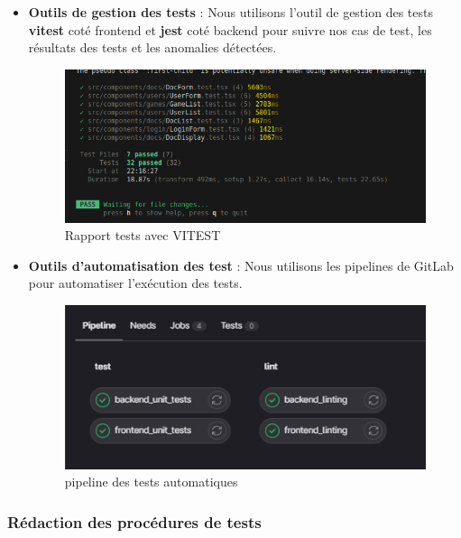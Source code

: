 \begin{itemize}\addtolength{\itemsep}{-0.35\baselineskip}%
	\item \textbf{Outils de gestion des tests }: Nous utilisons l'outil de gestion des tests \textbf{vitest} coté frontend et \textbf{jest} coté backend pour suivre nos cas de test, les résultats des tests et les anomalies détectées.
	      \begin{figure}[h]
		      \center
		      \includegraphics[scale=0.5]{./images/test_frontend_il.png}
		      \caption[Rapport test frontend avec VITEST]{Rapport tests avec VITEST}\label{fig:test_frontend_il}
	      \end{figure}
	\item \textbf{Outils d'automatisation des test} : Nous utilisons les pipelines de GitLab pour automatiser l'exécution des tests.
	      \begin{figure}[h]
		      \center
		      \includegraphics[scale=0.8]{./images/pipeline_tests.png}
		      \caption[pipeline des tests automatiques]{pipeline des tests automatiques}\label{fig:pipeline_tests}
	      \end{figure}
\end{itemize}


\subsubsection{Rédaction des procédures de tests}

